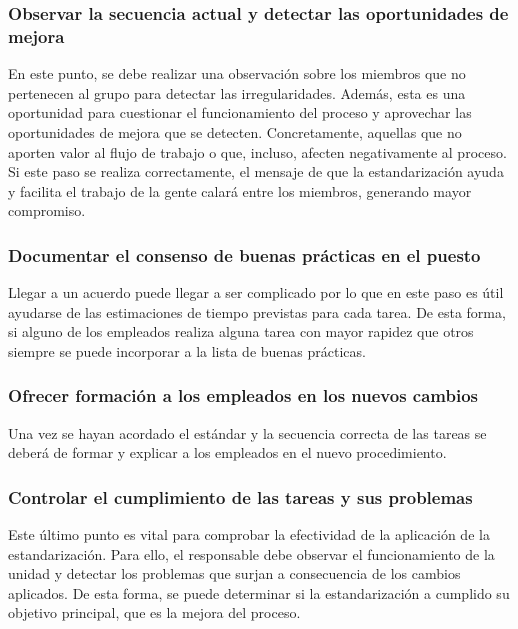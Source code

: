 \subsubsection{Observar la secuencia actual y detectar las oportunidades de mejora}

En este punto, se debe realizar una observación sobre los miembros que no pertenecen al grupo para detectar las irregularidades.
Además, esta es una oportunidad para cuestionar el funcionamiento del proceso y aprovechar las oportunidades de mejora que se detecten.
Concretamente, aquellas que no aporten valor al flujo de trabajo o que, incluso, afecten negativamente al proceso.
Si este paso se realiza correctamente, el mensaje de que la estandarización ayuda y facilita el trabajo de la gente calará entre los miembros, generando mayor compromiso.

\subsubsection{Documentar el consenso de buenas prácticas en el puesto}

Llegar a un acuerdo puede llegar a ser complicado por lo que en este paso es útil ayudarse de las estimaciones de tiempo previstas para cada tarea.
De esta forma, si alguno de los empleados realiza alguna tarea con mayor rapidez que otros siempre se puede incorporar a la lista de buenas prácticas.

\subsubsection{Ofrecer formación a los empleados en los nuevos cambios}

Una vez se hayan acordado el estándar y la secuencia correcta de las tareas se deberá de formar y explicar a los empleados en el nuevo procedimiento.

\subsubsection{Controlar el cumplimiento de las tareas y sus problemas}

Este último punto es vital para comprobar la efectividad de la aplicación de la estandarización.
Para ello, el responsable debe observar el funcionamiento de la unidad y detectar los problemas que surjan a consecuencia de los cambios aplicados.
De esta forma, se puede determinar si la estandarización a cumplido su objetivo principal, que es la mejora del proceso.

